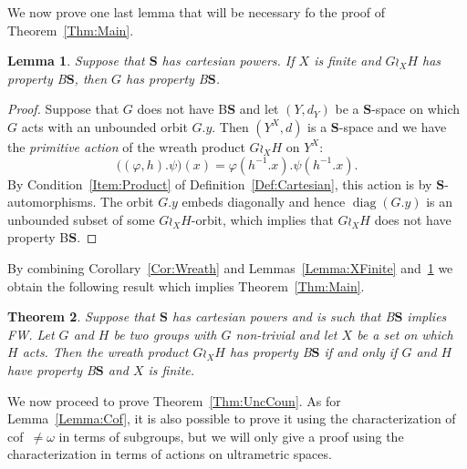 \documentclass[a4paper]{article}
\newtheorem{lem}{Lemma}[section]
\newtheorem{thm}[lem]{Theorem}
\theoremstyle{definition}
\DeclareMathOperator\diag{diag}
\newcommand*{\BS}{B$\mathbf{S}$}
\begin{document}
%
%
We now prove one last lemma that will be necessary fo the proof of Theorem~\ref{Thm:Main}.
%
%
\begin{lem}\label{Lemma:Unboundedness}
Suppose that $\mathbf{S}$ has cartesian powers. If $X$ is finite and $G\wr_XH$ has property \BS, then $G$ has property \BS.
\end{lem}
\begin{proof}
Suppose that $G$ does not have \BS{} and let $(Y,d_Y)$ be a $\mathbf S$-space on which $G$ acts with an unbounded orbit $G.y$.
Then $(Y^X,d)$ is a $\mathbf S$-space and we have the \emph{primitive action} of the wreath product $G\wr_XH$ on $Y^X$:
\[
	\bigl((\varphi,h).\psi\bigr)(x)=\varphi(h^{-1}.x).\psi(h^{-1}.x).
\]
By Condition~\ref{Item:Product} of Definition~\ref{Def:Cartesian}, this action is by $\mathbf{S}$-automorphisms.
The orbit $G.y$ embeds diagonally and hence $\diag(G.y)$ is an unbounded subset of some $G\wr_XH$-orbit, which implies that $G\wr_XH$ does not have property \BS.
\end{proof}
%
%
By combining Corollary~\ref{Cor:Wreath} and Lemmas~\ref{Lemma:XFinite} and~\ref{Lemma:Unboundedness} we obtain the following result which implies Theorem~\ref{Thm:Main}.
%
%
\begin{thm}\label{Thm:Technic}
Suppose that $\mathbf{S}$ has cartesian powers and is such that \BS{} implies FW.
Let $G$ and $H$ be two groups with $G$ non-trivial and let $X$ be a set on which $H$ acts. Then the wreath product $G \wr_X H$ has property \BS{} if and only if $G$ and $H$ have property \BS{} and $X$ is finite.
\end{thm}
%
%
We now proceed to prove Theorem~\ref{Thm:UncCoun}.
As for Lemma~\ref{Lemma:Cof}, it is also possible to prove it using the characterization of cof~$\neq\omega$ in terms of subgroups, but we will only give a proof using the characterization in terms of actions on ultrametric spaces.
%
%
\end{document}
